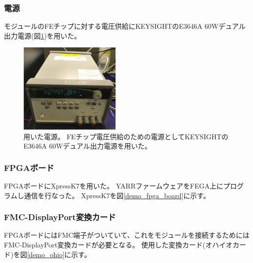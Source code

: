 \subsubsection{電源}
モジュールのFEチップに対する電圧供給にKEYSIGHTのE3646A 60Wデュアル出力電源\cite{5-1}(図\ref{demo_power_supply})を用いた。
\begin{figure}[h]\centering
\includegraphics[width=5cm]{./power_supply.png}
\caption[用いた電源]{用いた電源。 FEチップ電圧供給のための電源としてKEYSIGHTのE3646A 60Wデュアル出力電源\cite{5-1}を用いた。}
\label{demo_power_supply}
\end{figure}

\subsubsection{FPGAボード}
FPGAボードにXpressK7\cite{5-2}を用いた。
YARRファームウェアをFEGA上にプログラムし通信を行なった。
XpressK7を図\ref{demo_fpga_board}に示す。

\subsubsection{FMC-DisplayPort変換カード}
FPGAボードにはFMC端子がついていて、これをモジュールを接続するためにはFMC-DisplayPort変換カードが必要となる。
使用した変換カード(オハイオカード)を図\ref{demo_ohio}に示す。


